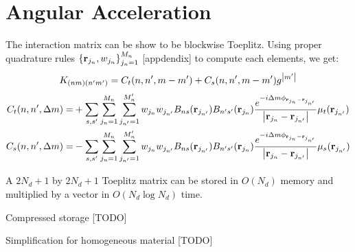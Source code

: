 \documentclass[main]{subfiles}
\begin{document}
\section{Angular Acceleration}
\label{sec:angular acceleration}
The interaction matrix can be show to be blockwise Toeplitz.
Using proper quadrature rules $\left\{\mathbf{r}_{j_n},w_{j_n}\right\}_{j_n=1}^{M_n}$ 
[appdendix] to compute each elements, we get:
\begin{equation*}
	K_{(nm)(n^{\prime} m^{\prime})} = C_t(n,n^{\prime},m-m^{\prime}) + 
	C_s(n,n^{\prime},m-m^{\prime})g^{\left| m^{\prime} \right|} 
\end{equation*}
\begin{align*}
C_t(n,n^{\prime},\Delta m)=&+\sum\limits_{s,s^{\prime}}\sum\limits_{j_n=1}^{M_n}
\sum\limits_{j_{n^{\prime}}=1}^{M_n^{\prime}} w_{j_n}w_{j_{n^{\prime}}}
B_{ns}(\mathbf{r}_{j_{n^{\prime}}})B_{n^{\prime} s^{\prime}}(\mathbf{r}_{j_n})
\frac{e^{-i \Delta m \phi_{\mathbf{r}_{j_n}-\mathbf{r}_{j_{n^{\prime}}}}}} 
{\left| \mathbf{r}_{j_n}-\mathbf{r}_{j_{n^{\prime}}} \right|} \mu_t(\mathbf{r}_{j_{n^{\prime}}})
\\
C_s(n,n^{\prime},\Delta m)=&-\sum\limits_{s,s^{\prime}}\sum\limits_{j_n=1}^{M_n}
\sum\limits_{j_{n^{\prime}}=1}^{M_n^{\prime}} w_{j_n}w_{j_{n^{\prime}}}
B_{ns}(\mathbf{r}_{j_{n^{\prime}}})B_{n^{\prime} s^{\prime}}(\mathbf{r}_{j_n})
\frac{e^{-i \Delta m \phi_{\mathbf{r}_{j_n}-\mathbf{r}_{j_{n^{\prime}}}}}} 
{\left| \mathbf{r}_{j_n}-\mathbf{r}_{j_{n^{\prime}}} \right|} \mu_s(\mathbf{r}_{j_{n^{\prime}}})
\end{align*}

A $2N_d+1$ by $2N_d+1$ Toeplitz matrix can be stored in $O(N_d)$ memory and
multiplied by a vector in $O(N_d \log{N_d})$ time.

Compressed storage [TODO]

Simplification for homogeneous material [TODO]
\end{document}
